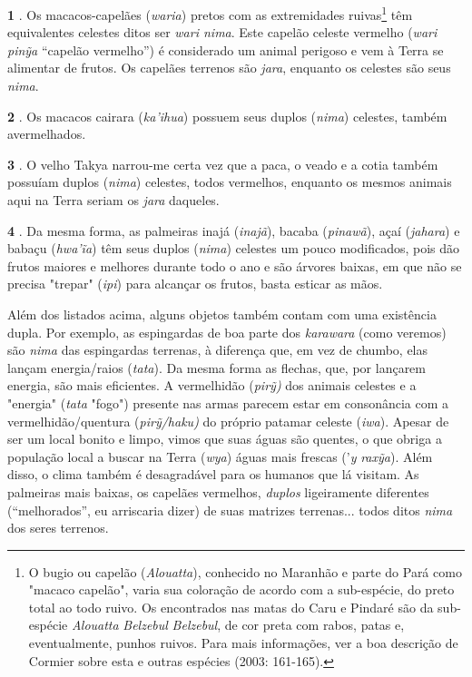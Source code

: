 \textbf{1} . Os macacos-capelães (\emph{waria}) pretos com as
extremidades ruivas\footnote{O bugio ou capelão (\emph{Alouatta}),
  conhecido no Maranhão e parte do Pará como "macaco capelão", varia sua
  coloração de acordo com a sub-espécie, do preto total ao todo ruivo.
  Os encontrados nas matas do Caru e Pindaré são da sub-espécie
  \emph{Alouatta} \emph{Belzebul} \emph{Belzebul}, de cor preta com
  rabos, patas e, eventualmente, punhos ruivos. Para mais informações,
  ver a boa descrição de Cormier sobre esta e outras espécies (2003:
  161-165).} têm equivalentes celestes ditos ser \emph{wari nima}. Este
capelão celeste vermelho (\emph{wari} \emph{pinỹa} ``capelão vermelho'')
é considerado um animal perigoso e vem à Terra se alimentar de frutos.
Os capelães terrenos são \emph{jara}, enquanto os celestes são seus
\emph{nima}.

\textbf{2} . Os macacos cairara (\emph{ka'ihua}) possuem seus duplos
(\emph{nima}) celestes, também avermelhados.

\textbf{3} . O velho Takya narrou-me certa vez que a paca, o veado e a
cotia também possuíam duplos (\emph{nima}) celestes, todos vermelhos,
enquanto os mesmos animais aqui na Terra seriam os \emph{jara} daqueles.

\textbf{4} . Da mesma forma, as palmeiras inajá (\emph{inajã}), bacaba
(\emph{pinawã}), açaí (\emph{jahara}) e babaçu (\emph{hwa'ĩa}) têm seus
duplos (\emph{nima}) celestes um pouco modificados, pois dão frutos
maiores e melhores durante todo o ano e são árvores baixas, em que não
se precisa "trepar" (\emph{ipi}) para alcançar os frutos, basta esticar
as mãos.

Além dos listados acima, alguns objetos também contam com uma existência
dupla. Por exemplo, as espingardas de boa parte dos \emph{karawara}
(como veremos) são \emph{nima} das espingardas terrenas, à diferença
que, em vez de chumbo, elas lançam energia/raios (\emph{tata}). Da mesma
forma as flechas, que, por lançarem energia, são mais eficientes. A
vermelhidão (\emph{pirỹ)} dos animais celestes e a "energia"
(\emph{tata} "fogo") presente nas armas parecem estar em consonância com
a vermelhidão/quentura (\emph{pirỹ/haku)} do próprio patamar celeste
(\emph{iwa}). Apesar de ser um local bonito e limpo, vimos que suas
águas são quentes, o que obriga a população local a buscar na Terra
(\emph{wya}) águas mais frescas ('\emph{y} \emph{raxỹa}). Além disso, o
clima também é desagradável para os humanos que lá visitam. As palmeiras
mais baixas, os capelães vermelhos, \emph{duplos} ligeiramente
diferentes (``melhorados'', eu arriscaria dizer) de suas matrizes
terrenas... todos ditos \emph{nima} dos seres terrenos.

